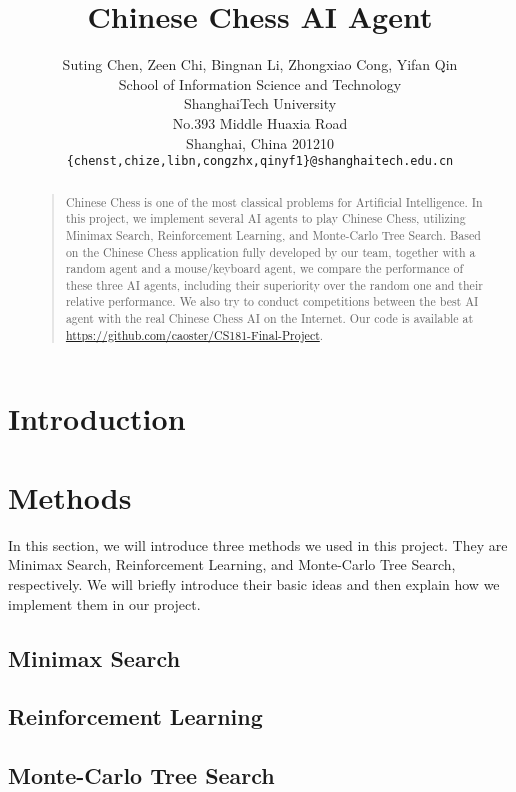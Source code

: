 \documentclass[letterpaper]{article}
\title{Chinese Chess AI Agent}
\author{Suting Chen, Zeen Chi, Bingnan Li, Zhongxiao Cong, Yifan Qin\\
School of Information Science and Technology\\
ShanghaiTech University\\
No.393 Middle Huaxia Road\\
Shanghai, China 201210\\
\texttt{\{chenst,chize,libn,congzhx,qinyf1\}@shanghaitech.edu.cn}
}
\begin{document}
\maketitle

\begin{abstract}
\begin{quote}
Chinese Chess is one of the most classical problems for Artificial Intelligence.
In this project, we implement several AI agents to play Chinese Chess, utilizing Minimax Search, Reinforcement Learning, and Monte-Carlo Tree Search.
Based on the Chinese Chess application fully developed by our team, together with a random agent and a mouse/keyboard agent, we compare the performance of these three AI agents, including their superiority over the random one and their relative performance.
We also try to conduct competitions between the best AI agent with the real Chinese Chess AI on the Internet.
Our code is available at \url{https://github.com/caoster/CS181-Final-Project}.
\end{quote}
\end{abstract}

\section{Introduction}\label{sec:introduction}


\section{Methods}\label{sec:methods}

In this section, we will introduce three methods we used in this project.
They are Minimax Search, Reinforcement Learning, and Monte-Carlo Tree Search, respectively.
We will briefly introduce their basic ideas and then explain how we implement them in our project.

\subsection{Minimax Search}\label{subsec:minimax-search}


\subsection{Reinforcement Learning}\label{subsec:reinforcement-learning}


\subsection{Monte-Carlo Tree Search}
\label{subsec:monte-carlo-tree-search}

\end{document}
